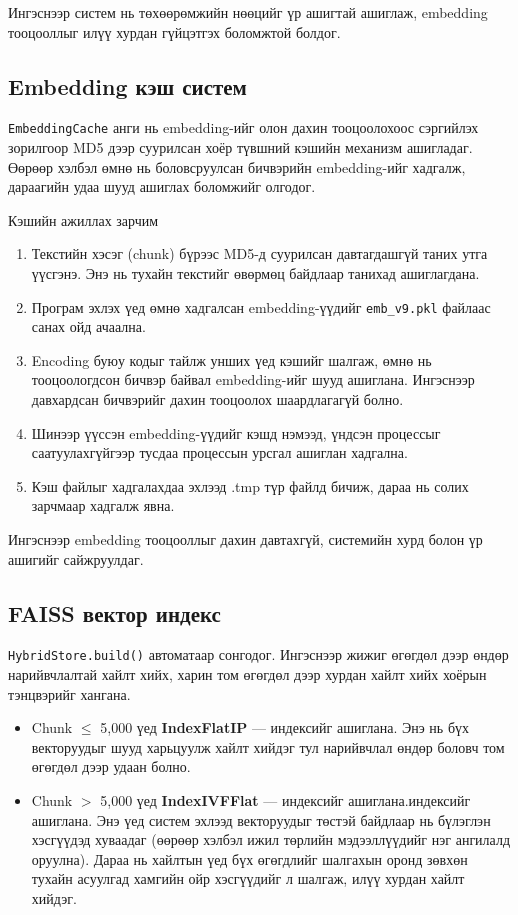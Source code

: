 \documentclass[11pt,a4paper]{article}
\begin{document}
Ингэснээр систем нь төхөөрөмжийн нөөцийг үр ашигтай ашиглаж, embedding тооцооллыг илүү хурдан гүйцэтгэх боломжтой болдог.

\subsection{Embedding кэш систем}

\texttt{EmbeddingCache} анги нь embedding-ийг олон дахин тооцоолохоос сэргийлэх зорилгоор MD5 дээр суурилсан хоёр түвшний кэшийн механизм ашигладаг. Өөрөөр хэлбэл өмнө нь боловсруулсан бичвэрийн embedding-ийг хадгалж, дараагийн удаа шууд ашиглах боломжийг олгодог.

Кэшийн ажиллах зарчим

\begin{enumerate}
\item Текстийн хэсэг (chunk) бүрээс MD5-д суурилсан давтагдашгүй таних утга үүсгэнэ. Энэ нь тухайн текстийг өвөрмөц байдлаар танихад ашиглагдана.
\item Програм эхлэх үед өмнө хадгалсан embedding-үүдийг \texttt{emb\_v9.pkl} файлаас санах ойд ачаална.
\item Encoding буюу кодыг тайлж унших үед кэшийг шалгаж, өмнө нь тооцоологдсон бичвэр байвал embedding-ийг шууд ашиглана. Ингэснээр давхардсан бичвэрийг дахин тооцоолох шаардлагагүй болно.
\item Шинээр үүссэн embedding-үүдийг кэшд нэмээд, үндсэн процессыг саатуулахгүйгээр тусдаа процессын урсгал ашиглан хадгална.
\item Кэш файлыг хадгалахдаа эхлээд .tmp түр файлд бичиж, дараа нь солих зарчмаар хадгалж явна.
\end{enumerate}

Ингэснээр embedding тооцооллыг дахин давтахгүй, системийн хурд болон үр ашигийг сайжруулдаг.
\subsection{FAISS вектор индекс}

\texttt{HybridStore.build()} автоматаар сонгодог. Ингэснээр жижиг өгөгдөл дээр өндөр нарийвчлалтай хайлт хийх, харин том өгөгдөл дээр хурдан хайлт хийх хоёрын тэнцвэрийг хангана.

\begin{itemize}
      \item Chunk $\le$ 5,000 үед \textbf{IndexFlatIP} --- индексийг ашиглана. Энэ нь бүх векторуудыг шууд харьцуулж хайлт хийдэг тул нарийвчлал өндөр боловч том өгөгдөл дээр удаан болно.
      \item Chunk $>$ 5,000 үед \textbf{IndexIVFFlat} --- индексийг ашиглана.индексийг ашиглана. Энэ үед систем эхлээд векторуудыг төстэй байдлаар нь бүлэглэн хэсгүүдэд хуваадаг (өөрөөр хэлбэл ижил төрлийн мэдээллүүдийг нэг ангилалд оруулна). Дараа нь хайлтын үед бүх өгөгдлийг шалгахын оронд зөвхөн тухайн асуулгад хамгийн ойр хэсгүүдийг л шалгаж, илүү хурдан хайлт хийдэг.
\end{itemize}
\end{document}

